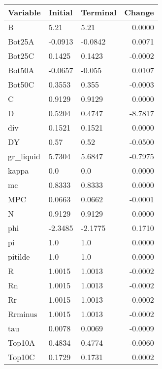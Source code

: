 \begin{table}
\centering
\label{tab:stst_comparison_baseline_limit_permanent}
\begin{tabular}{lllr}
\toprule
                Variable & Initial & Terminal &  Change \\
\midrule
                       B &    5.21 &     5.21 &  0.0000 \\
                  Bot25A & -0.0913 &  -0.0842 &  0.0071 \\
                  Bot25C &  0.1425 &   0.1423 & -0.0002 \\
                  Bot50A & -0.0657 &   -0.055 &  0.0107 \\
                  Bot50C &  0.3553 &    0.355 & -0.0003 \\
                       C &  0.9129 &   0.9129 &  0.0000 \\
                       D &  0.5204 &   0.4747 & -8.7817 \\
                     div &  0.1521 &   0.1521 &  0.0000 \\
                      DY &    0.57 &     0.52 & -0.0500 \\
               gr\_liquid &  5.7304 &   5.6847 & -0.7975 \\
                   kappa &     0.0 &      0.0 &  0.0000 \\
                      mc &  0.8333 &   0.8333 &  0.0000 \\
                     MPC &  0.0663 &   0.0662 & -0.0001 \\
                       N &  0.9129 &   0.9129 &  0.0000 \\
                     phi & -2.3485 &  -2.1775 &  0.1710 \\
                      pi &     1.0 &      1.0 &  0.0000 \\
                 pitilde &     1.0 &      1.0 &  0.0000 \\
                       R &  1.0015 &   1.0013 & -0.0002 \\
                      Rn &  1.0015 &   1.0013 & -0.0002 \\
                      Rr &  1.0015 &   1.0013 & -0.0002 \\
                 Rrminus &  1.0015 &   1.0013 & -0.0002 \\
                     tau &  0.0078 &   0.0069 & -0.0009 \\
                  Top10A &  0.4834 &   0.4774 & -0.0060 \\
                  Top10C &  0.1729 &   0.1731 &  0.0002 \\

\end{tabular}
\end{table}
